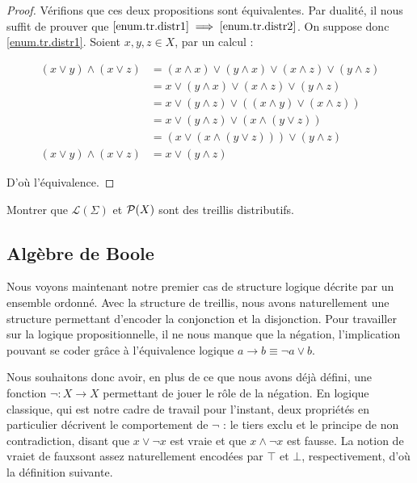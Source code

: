 \begin{proof}
  Vérifions que ces deux propositions sont équivalentes. Par dualité, il nous
  suffit de prouver que $\ref{enum.tr.distr1} \implies\ref{enum.tr.distr2}$.
  On suppose donc \ref{enum.tr.distr1}. Soient $x,y,z\in X$, par un calcul :

  \begin{align*}
    (x\lor y) \land (x \lor z) &= (x \land x) \lor (y \land x)
    \lor (x \land z) \lor (y \land z)\\
    &= x\lor (y\land x) \lor (x \land z) \lor (y \land z)\\
    &= x\lor (y\land z) \lor ((x\land y)\lor (x\land z))\\
    &= x\lor (y\land z) \lor (x\land (y \lor z))\\
    &= (x\lor (x\land (y \lor z)))\lor (y \land z)\\
    (x\lor y)\land (x\lor z)&= x\lor (y \land z)
  \end{align*}

  D'où l'équivalence.
\end{proof}

\begin{exercise}
  Montrer que $\mathcal L(\Sigma)$ et $\mathcal{P}(X)$ sont des treillis
  distributifs.
\end{exercise}

\subsection{Algèbre de Boole}

Nous voyons maintenant notre premier cas de structure logique décrite par un
ensemble ordonné. Avec la structure de treillis, nous avons naturellement une
structure permettant d'encoder la conjonction et la disjonction. Pour travailler
sur la logique propositionnelle, il ne nous manque que la négation,
l'implication pouvant se coder grâce à l'équivalence logique
$a\to b \equiv \lnot a \lor b$.

Nous souhaitons donc avoir, en plus de ce que nous avons déjà défini, une
fonction $\lnot : X \to X$ permettant de jouer le rôle de la négation. En
logique classique, qui est notre cadre de travail pour l'instant, deux
propriétés en particulier décrivent le comportement de $\lnot$ : le tiers exclu
et le principe de non contradiction, disant que $x\lor \lnot x$ est vraie et que
$x\land \lnot x$ est fausse. La notion de \og vrai\fg et de \og faux\fg sont
assez naturellement encodées par $\top$ et $\bot$, respectivement, d'où la
définition suivante.

